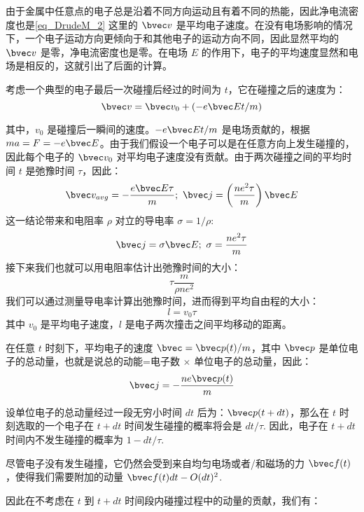 由于金属中任意点的电子总是沿着不同方向运动且有着不同的热能，因此净电流密度也是\autoref{eq_DrudeM_2} 这里的 $\bvec v$ 是平均电子速度。在没有电场影响的情况下，一个电子运动方向更倾向于和其他电子的运动方向不同，因此显然平均的 $\bvec v$ 是零，净电流密度也是零。在电场 $E$ 的作用下，电子的平均速度显然和电场是相反的，这就引出了后面的计算。

考虑一个典型的电子最后一次碰撞后经过的时间为 $t$，它在碰撞之后的速度为：
\begin{equation}
\bvec v = \bvec v_0 + (-e\bvec E t/m)
\end{equation}

其中，$v_0$ 是碰撞后一瞬间的速度。$-e\bvec E t/m$ 是电场贡献的，根据 $ma = F = -e\bvec E$。由于我们假设一个电子可以是在任意方向上发生碰撞的，因此每个电子的 $\bvec v_0$ 对平均电子速度没有贡献。由于两次碰撞之间的平均时间 $t$ 是弛豫时间 $\tau$，因此：
\begin{equation}
\bvec v_{avg} = -\frac{e\bvec E \tau}{m}; \ \bvec j =\left(\frac{ne^2\tau}{m}\right)\bvec E
\end{equation}
这一结论带来和电阻率 $\rho$ 对立的导电率 $\sigma = 1/\rho$:
\begin{equation}\label{eq_DrudeM_4}
\bvec j = \sigma \bvec E; \ \sigma = \frac{ne^2\tau}{m}
\end{equation}
接下来我们也就可以用电阻率估计出弛豫时间的大小：
\begin{equation}
\tau \frac{m}{\rho n e^2}
\end{equation}
我们可以通过测量导电率计算出弛豫时间，进而得到平均自由程的大小：
\begin{equation}
l=v_0\tau
\end{equation}
其中 $v_0$ 是平均电子速度，$l$ 是电子两次撞击之间平均移动的距离。

在任意 $t$ 时刻下，平均电子的速度 $\bvec=\bvec p(t)/m$，其中 $\bvec p$ 是单位电子的总动量，也就是说总的动能=电子数 $\times$ 单位电子的总动量，因此：
\begin{equation}
\bvec j= -\frac{ne\bvec p(t)}{m}
\end{equation}

设单位电子的总动量经过一段无穷小时间 $dt$ 后为：$\bvec p (t+dt)$，那么在 $t$ 时刻选取的一个电子在 $t+dt$ 时间发生碰撞的概率将会是 $dt/\tau$. 因此，电子在 $t+dt$ 时间内不发生碰撞的概率为 $1-dt/\tau$.

尽管电子没有发生碰撞，它仍然会受到来自均匀电场或者/和磁场的力 $\bvec f(t)$，使得我们需要附加的动量 $\bvec f(t)dt - O(dt)^2$.

因此在不考虑在 $t$ 到 $t+dt$ 时间段内碰撞过程中的动量的贡献，我们有：


